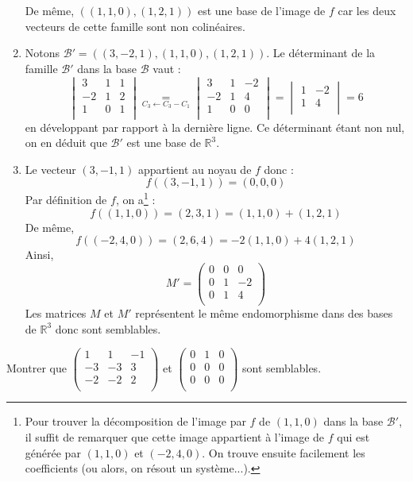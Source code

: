 \documentclass[a4paper,twoside,french,11pt]{VcCours}
\begin{document}
\begin{enumerate}
De même, $((1,1,0),(1,2,1))$ est une base de l'image de $f$ car les deux vecteurs de cette famille sont non colinéaires.
\item Notons $\mathcal{B}'=((3,-2,1),(1,1,0),(1,2,1))$. Le déterminant de la famille $\mathcal{B}'$ dans la base $\mathcal{B}$ vaut :
$$ \begin{vmatrix}
3 & 1 & 1 \\
-2 & 1 & 2\\
1& 0 & 1\\
\end{vmatrix}  \underset{C_3 \leftarrow C_3 - C_1}{=} \begin{vmatrix}
3 & 1 & -2 \\
-2 & 1 & 4\\
1& 0 & 0\\
\end{vmatrix} = \begin{vmatrix}
 1 & -2 \\
 1 & 4\\
\end{vmatrix} = 6 $$
en développant par rapport à la dernière ligne. Ce déterminant étant non nul, on en déduit que $\mathcal{B}'$ est une base de $\mathbb{R}^3$.
\item Le vecteur $(3,-1,1)$ appartient au noyau de $f$ donc :
$$ f((3,-1,1))=(0,0,0)$$
Par définition de $f$, on a\footnote{Pour trouver la décomposition de l'image par $f$ de $(1,1,0)$ dans la base $\mathcal{B}'$, il suffit de remarquer que cette image appartient à l'image de $f$ qui est générée par $(1,1,0)$ et $(-2,4,0)$. On trouve ensuite facilement les coefficients (ou alors, on résout un système...).} :
$$ f((1,1,0))=(2,3,1) = (1,1,0) + (1,2,1)$$
De même,
$$ f((-2,4,0))=(2,6,4) = -2(1,1,0) + 4(1,2,1) $$
Ainsi,
$$ M' = \begin{pmatrix}
0 & 0 & 0 \\
0 & 1 & -2 \\
0 & 1 & 4 \\
\end{pmatrix}$$
Les matrices $M$ et $M'$ représentent le même endomorphisme dans des bases de $\mathbb{R}^3$ donc sont semblables.
\end{enumerate}



\begin{Exercice}{} Montrer que $\begin{pmatrix}
1 & 1 & -1 \\
-3 & -3 & 3 \\
-2 & -2 & 2 \\
\end{pmatrix}$ et $\begin{pmatrix}
0 & 1 & 0 \\
0 & 0 & 0 \\
0 & 0 & 0 \\
\end{pmatrix}$ sont semblables.
\end{Exercice}
\end{document}
